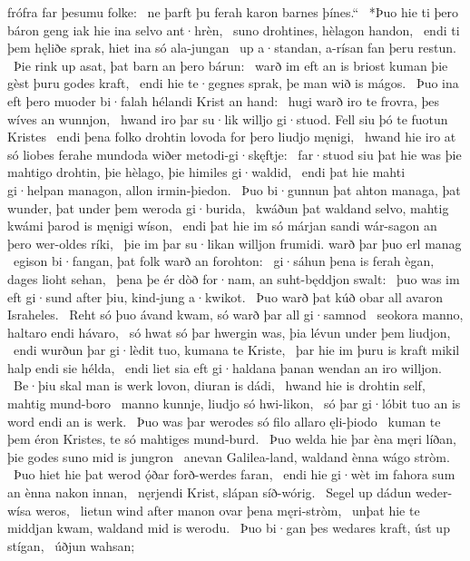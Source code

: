 frófra far þesumu folke: \hld\ ne þarft þu ferah karon
barnes þínes.“ \hld\ *Þuo hie ti þero báron geng
iak hie ina selvo ant·hrèn, \hld\ suno drohtines,
hèlagon handon, \hld\ endi ti þem hęliðe sprak,
hiet ina só ala-jungan \hld\ up a·standan,
a-rísan fan þeru restun. \hld\ Þie rink up asat,
þat barn an þero bárun: \hld\ warð im eft an is briost kuman
þie gèst þuru godes kraft, \hld\ endi hie te·gegnes sprak,
þe man wið is mágos. \hld\ Þuo ina eft þero muoder bi·falah
hélandi Krist an hand: \hld\ hugi warð iro te frovra,
þes wíves an wunnjon, \hld\ hwand iro þar su·lik willjo gi·stuod.
Fell siu þó te fuotun Kristes \hld\ endi þena folko drohtin
lovoda for þero liudjo męnigi, \hld\ hwand hie iro at só liobes ferahe
mundoda wiðer metodi-gi·skęftje: \hld\ far·stuod siu þat hie was þie mahtigo drohtin,
þie hèlago, þie himiles gi·waldid, \hld\ endi þat hie mahti gi·helpan managon,
allon irmin-þiedon. \hld\ Þuo bi·gunnun þat ahton managa,
þat wunder, þat under þem weroda gi·burida, \hld\ kwáðun þat waldand selvo,
mahtig kwámi þarod is męnigi wíson, \hld\ endi þat hie im só márjan sandi
wár-sagon an þero wer-oldes ríki, \hld\ þie im þar su·likan willjon frumidi.
warð þar þuo erl manag \hld\ egison bi·fangan,
þat folk warð an forohton: \hld\ gi·sáhun þena is ferah ègan,
dages lioht sehan, \hld\ þena þe ér dòð for·nam,
an suht-będdjon swalt: \hld\ þuo was im eft gi·sund after þiu,
kind-jung a·kwikot. \hld\ Þuo warð þat kúð obar all
avaron Israheles. \hld\ Reht só þuo ávand kwam,
só warð þar all gi·samnod \hld\ seokora manno,
haltaro endi hávaro, \hld\ só hwat só þar hwergin was,
þia lévun under þem liudjon, \hld\ endi wurðun þar gi·lèdit tuo,
kumana te Kriste, \hld\ þar hie im þuru is kraft mikil
halp endi sie hélda, \hld\ endi liet sia eft gi·haldana þanan
wendan an iro willjon. \hld\ Be·þiu skal man is werk lovon,
diuran is dádi, \hld\ hwand hie is drohtin self,
mahtig mund-boro \hld\ manno kunnje,
liudjo só hwi-likon, \hld\ só þar gi·lóbit tuo
an is word endi an is werk. \hld\ Þuo was þar werodes só filo
allaro ęli-þiodo \hld\ kuman te þem éron Kristes,
te só mahtiges mund-burd. \hld\ Þuo welda hie þar èna męri líðan,
þie godes suno mid is jungron \hld\ anevan Galilea-land,
waldand ènna wágo stròm. \hld\ Þuo hiet hie þat werod ǫ́ðar
forð-werdes faran, \hld\ endi hie gi·wèt im fahora sum
an ènna nakon innan, \hld\ nęrjendi Krist,
slápan síð-wórig. \hld\ Segel up dádun
weder-wísa weros, \hld\ lietun wind after
manon ovar þena męri-stròm, \hld\ unþat hie te middjan kwam,
waldand mid is werodu. \hld\ Þuo bi·gan þes wedares kraft,
úst up stígan, \hld\ úðjun wahsan;
